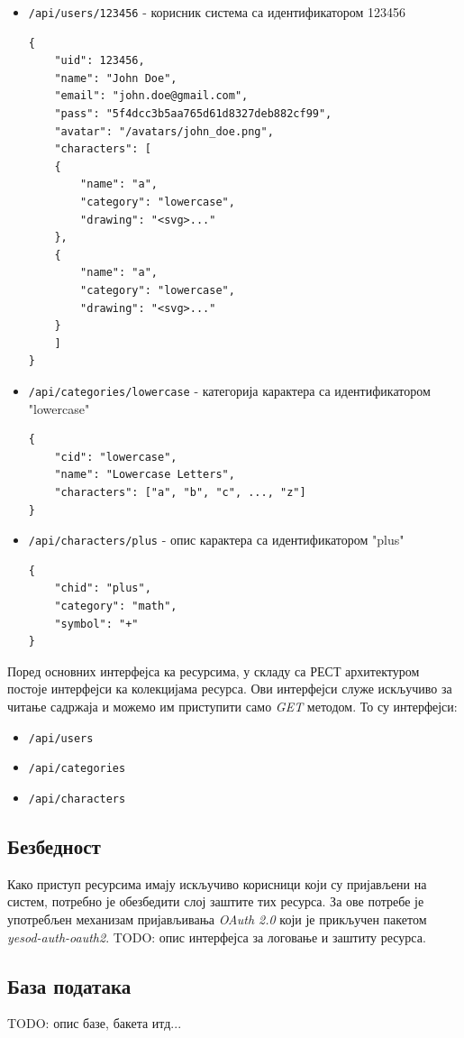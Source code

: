 \documentclass[a4paper]{article}
\begin{document}
\begin{itemize}
\item \lstinline[basicstyle=\ttfamily\color{black}]|/api/users/123456| - корисник система са идентификатором 123456
\begin{lstlisting}[style=json]
{
    "uid": 123456,
    "name": "John Doe",
    "email": "john.doe@gmail.com",
    "pass": "5f4dcc3b5aa765d61d8327deb882cf99",
    "avatar": "/avatars/john_doe.png",
    "characters": [
    {
        "name": "a",
        "category": "lowercase",
        "drawing": "<svg>..."
    },
    {
        "name": "a",
        "category": "lowercase",
        "drawing": "<svg>..."
    }
    ]
}
\end{lstlisting}

\item \lstinline[basicstyle=\ttfamily\color{black}]|/api/categories/lowercase| - категорија карактера са идентификатором "lowercase"
\begin{lstlisting}[style=json]
{
    "cid": "lowercase",
    "name": "Lowercase Letters",
    "characters": ["a", "b", "c", ..., "z"]
}
\end{lstlisting}
\clearpage
\item \lstinline[basicstyle=\ttfamily\color{black}]|/api/characters/plus| - опис карактера са идентификатором "plus"
\begin{lstlisting}[style=json]
{
    "chid": "plus",
    "category": "math",
    "symbol": "+"
}
\end{lstlisting}

\end{itemize}
Поред основних интерфејса ка ресурсима, у складу са РЕСТ архитектуром постоје интерфејси ка колекцијама ресурса. Ови интерфејси служе искључиво за читање садржаја и можемо им приступити само \textit{GET} методом. То су интерфејси:
\begin{itemize}
\item \lstinline[basicstyle=\ttfamily\color{black}]|/api/users|
\item \lstinline[basicstyle=\ttfamily\color{black}]|/api/categories|
\item \lstinline[basicstyle=\ttfamily\color{black}]|/api/characters|
\end{itemize}

\subsection{Безбедност}
Како приступ ресурсима имају искључиво корисници који су пријављени на систем, потребно је обезбедити слој заштите тих ресурса. За ове потребе је употребљен механизам пријављивања \textit{OAuth 2.0} који је прикључен пакетом \textit{yesod-auth-oauth2}.
TODO: опис интерфејса за логовање и заштиту ресурса.

\subsection{База података}
TODO: опис базе, бакета итд...
\end{document}
